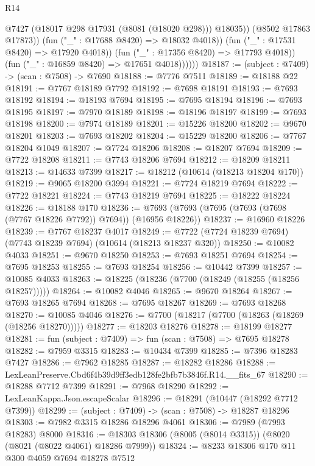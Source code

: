 \begin{lexlean}{R14}
\begin{coremodule}
                          @7427
                          (@18017 @298 @17931 (@8081 (@18020 @298)))
                          @18035))
                      (@8502 @17863 @17873))
                    (fun ("_" : @17688 @8420) => @18032 @4018))
                  (fun ("_" : @17531 @8420) => @17920 @4018))
                (fun ("_" : @17356 @8420) => @17793 @4018))
              (fun ("_" : @16859 @8420) => @17651 @4018))))))
@18187 := (subject : @7409) -> (scan : @7508) -> @7690
@18188 := @7776 @7511
@18189 := @18188 @22
@18191 := @7767 @18189 @7792
@18192 := @7698 @18191
@18193 := @7693 @18192
@18194 := @18193 @7694
@18195 := @7695 @18194
@18196 := @7693 @18195
@18197 := @7970 @18189
@18198 := @18196 @18197
@18199 := @7693 @18198
@18200 := @7974 @18189
@18201 := @15226 @18200
@18202 := @9670 @18201
@18203 := @7693 @18202
@18204 := @15229 @18200
@18206 := @7767 @18204 @1049
@18207 := @7724 @18206
@18208 := @18207 @7694
@18209 := @7722 @18208
@18211 := @7743 @18206 @7694
@18212 := @18209 @18211
@18213 := @14633 @7399
@18217 := @18212 (@10614 (@18213 @18204 @170))
@18219 := @9065 @18200 @3994
@18221 := @7724 @18219 @7694
@18222 := @7722 @18221
@18224 := @7743 @18219 @7694
@18225 := @18222 @18224
@18226 := @18188 @170
@18236 := @7693 (@7693 (@7695 (@7693 (@7698 (@7767 @18226 @7792)) @7694)) (@16956 @18226))
@18237 := @16960 @18226
@18239 := @7767 @18237 @4017
@18249 := @7722 (@7724 @18239 @7694) (@7743 @18239 @7694) (@10614 (@18213 @18237 @320))
@18250 := @10082 @4033
@18251 := @9670 @18250
@18253 := @7693 @18251 @7694
@18254 := @7695 @18253
@18255 := @7693 @18254
@18256 := @10442 @7399
@18257 := @10085 @4033
@18263 := @18225 (@18236 (@7700 (@18249 (@18255 (@18256 @18257)))))
@18264 := @10082 @4046
@18265 := @9670 @18264
@18267 := @7693 @18265 @7694
@18268 := @7695 @18267
@18269 := @7693 @18268
@18270 := @10085 @4046
@18276 := @7700 (@18217 (@7700 (@18263 (@18269 (@18256 @18270)))))
@18277 := @18203 @18276
@18278 := @18199 @18277
@18281 := fun (subject : @7409) => fun (scan : @7508) => @7695 @18278
@18282 := @7959 @3315
@18283 := @10434 @7399
@18285 := @7396 @18283 @7427
@18286 := @7962 @18285
@18287 := @18282 @18286
@18288 := LexLeanPreserve.Cbd6f4b39d9ff3edb128fe2bfb7b3846f.R14.__fits_67
@18290 := @18288 @7712 @7399
@18291 := @7968 @18290
@18292 := LexLeanKappa.Json.escapeScalar
@18296 := @18291 (@10447 (@18292 @7712 @7399))
@18299 := (subject : @7409) -> (scan : @7508) -> @18287 @18296
@18303 := @7982 @3315 @18286 @18296 @4061
@18306 := @7989 (@7993 @18283) @8000
@18316 := @18303 @18306 (@8005 (@8014 @3315)) (@8020 (@8021 (@8022 @4061) @18286 @7999))
@18324 := @8233 @18306 @170 @11 @300 @4059 @7694 @18278 @7512

\end{coremodule}
\end{lexlean}
